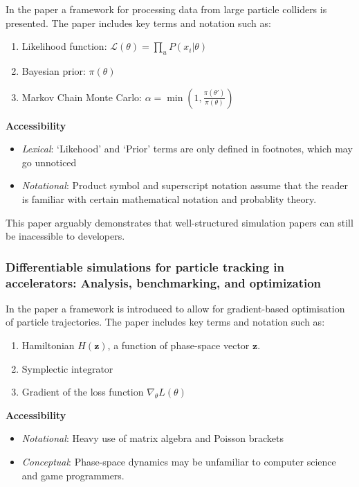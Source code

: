 In the paper  a framework for processing data from large particle colliders is presented.
The paper includes key terms and notation such as:
\begin{enumerate}
    \item Likelihood function: $\mathcal{L}(\theta)=\prod_u P(x_i|\theta)$
    \item Bayesian prior: $\pi(\theta)$
    \item Markov Chain Monte Carlo: $\alpha=\min\!\left(1,\frac{\pi(\theta')}{\pi(\theta)}\right)$
\end{enumerate}

\textbf{Accessibility}

\begin{itemize}
    \item \emph{Lexical}: `Likehood' and `Prior' terms are only defined in footnotes, which may go unnoticed
    \item \emph{Notational}: Product symbol and superscript notation assume that the reader is familiar with certain mathematical notation and probablity theory.
\end{itemize}

This paper arguably demonstrates that well-structured simulation papers can still be inacessible to developers.

\subsubsection*{Differentiable simulations for particle tracking in accelerators: Analysis, benchmarking, and optimization}

In the paper  a framework is introduced to allow for gradient-based optimisation of particle trajectories.
The paper includes key terms and notation such as:

\begin{enumerate}
    \item Hamiltonian $H(\mathbf{z})$, a function of phase-space vector $\mathbf{z}$.
    \item Symplectic integrator
    \item Gradient of the loss function $\nabla_{\theta}L(\theta)$
\end{enumerate}

\textbf{Accessibility}

\begin{itemize}
    \item \emph{Notational}: Heavy use of matrix algebra and Poisson brackets
    \item \emph{Conceptual}: Phase-space dynamics may be unfamiliar to computer science and game programmers.
\end{itemize}

